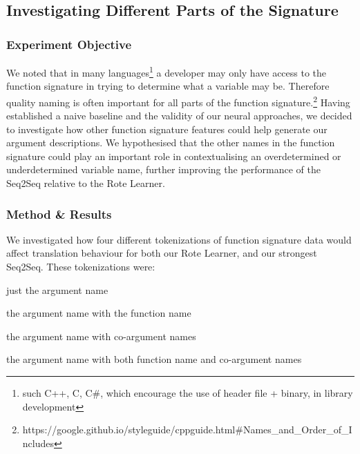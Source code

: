 \subsection{Investigating Different Parts of the Signature} %
\label{sub:investigating_different_tokenizations}

\subsubsection{Experiment Objective} %

We noted that in many languages\footnote{such C++, C, C\#, which encourage the use of header file + binary, in library development} 
a developer may only have access to the function signature in trying to determine what a variable may be. Therefore quality naming is often important for all parts of the function signature.\footnote{https://google.github.io/styleguide/cppguide.html\#Names\_and\_Order\_of\_Includes}
Having established a naive baseline and the validity of our neural approaches, we decided to investigate how other function signature features could help generate our argument descriptions.
We hypothesised that the other names in the function signature could play an important role in contextualising an overdetermined or underdetermined variable name, further improving the performance of the Seq2Seq relative to the Rote Learner. 


\subsubsection{Method \& Results} %

We investigated how four different tokenizations of function signature data would affect translation behaviour for both our Rote Learner, and our strongest Seq2Seq. 
These tokenizations were:
\begin{tight_enumerate}
    \item just the argument name
    \item the argument name with the function name
    \item the argument name with co-argument names 
    \item the argument name with both function name and co-argument names
\end{tight_enumerate}

